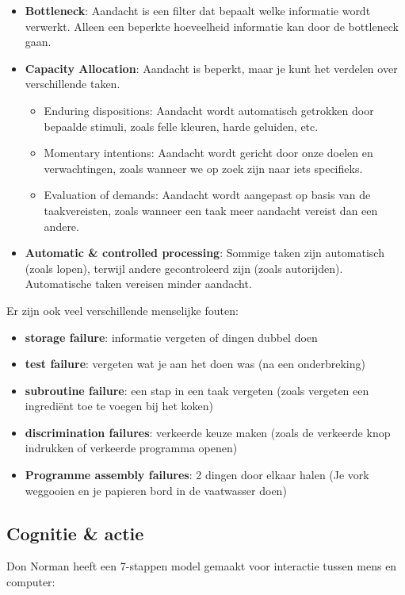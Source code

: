 \documentclass[nonacm, sigconf, balance=true]{acmart}
\begin{document}
    \begin{itemize}
        \item \textbf{Bottleneck}: Aandacht is een filter dat bepaalt welke informatie wordt verwerkt.
        Alleen een beperkte hoeveelheid informatie kan door de bottleneck gaan.
        \item \textbf{Capacity Allocation}: Aandacht is beperkt, maar je kunt het verdelen over verschillende taken.
        \begin{itemize}
            \item Enduring dispositions: Aandacht wordt automatisch getrokken door bepaalde stimuli, zoals felle kleuren, harde geluiden, etc.
            \item Momentary intentions: Aandacht wordt gericht door onze doelen en verwachtingen, zoals wanneer we op zoek zijn naar iets specifieks.
            \item Evaluation of demands: Aandacht wordt aangepast op basis van de taakvereisten, zoals wanneer een taak meer aandacht vereist dan een andere.
        \end{itemize}
        \item \textbf{Automatic \& controlled processing}: Sommige taken zijn automatisch (zoals lopen), terwijl andere gecontroleerd zijn (zoals autorijden).
        Automatische taken vereisen minder aandacht.
    \end{itemize}

    Er zijn ook veel verschillende menselijke fouten:
    \begin{itemize}
        \item \textbf{storage failure}: informatie vergeten of dingen dubbel doen
        \item \textbf{test failure}: vergeten wat je aan het doen was (na een onderbreking)
        \item \textbf{subroutine failure}: een stap in een taak vergeten (zoals vergeten een ingrediënt toe te voegen bij het koken)
        \item \textbf{discrimination failures}: verkeerde keuze maken (zoals de verkeerde knop indrukken of verkeerde programma openen)
        \item \textbf{Programme assembly failures}: 2 dingen door elkaar halen (Je vork weggooien en je papieren bord in de vaatwasser doen)
    \end{itemize}

    \subsection{Cognitie \& actie}
    Don Norman heeft een 7-stappen model gemaakt voor interactie tussen mens en computer:
\end{document}
